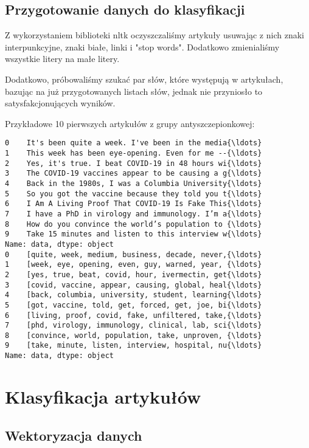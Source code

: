 \documentclass[11pt]{article}
\begin{document}
    
\subsection*{Przygotowanie danych do klasyfikacji}
 
Z wykorzystaniem biblioteki nltk oczyszczaliśmy artykuły usuwając z nich 
znaki interpunkcyjne, znaki białe, linki i "stop words". Dodatkowo zmienialiśmy
wszystkie litery na małe litery.

Dodatkowo, próbowaliśmy szukać par słów, które występują w artykułach, 
bazując na już przygotowanych listach słów, jednak nie przyniosło to 
satysfakcjonujących wyników.

Przykładowe 10 pierwszych artykułów z grupy antyszczepionkowej:

    \begin{Verbatim}[commandchars=\\\{\}]
0    It's been quite a week. I've been in the media{\ldots}
1    This week has been eye-opening. Even for me --{\ldots}
2    Yes, it's true. I beat COVID-19 in 48 hours wi{\ldots}
3    The COVID-19 vaccines appear to be causing a g{\ldots}
4    Back in the 1980s, I was a Columbia University{\ldots}
5    So you got the vaccine because they told you t{\ldots}
6    I Am A Living Proof That COVID-19 Is Fake This{\ldots}
7    I have a PhD in virology and immunology. I’m a{\ldots}
8    How do you convince the world’s population to {\ldots}
9    Take 15 minutes and listen to this interview w{\ldots}
Name: data, dtype: object
0    [quite, week, medium, business, decade, never,{\ldots}
1    [week, eye, opening, even, guy, warned, year, {\ldots}
2    [yes, true, beat, covid, hour, ivermectin, get{\ldots}
3    [covid, vaccine, appear, causing, global, heal{\ldots}
4    [back, columbia, university, student, learning{\ldots}
5    [got, vaccine, told, get, forced, get, joe, bi{\ldots}
6    [living, proof, covid, fake, unfiltered, take,{\ldots}
7    [phd, virology, immunology, clinical, lab, sci{\ldots}
8    [convince, world, population, take, unproven, {\ldots}
9    [take, minute, listen, interview, hospital, nu{\ldots}
Name: data, dtype: object
    \end{Verbatim}

\section*{Klasyfikacja artykułów}

\subsection*{Wektoryzacja danych}
\end{document}

